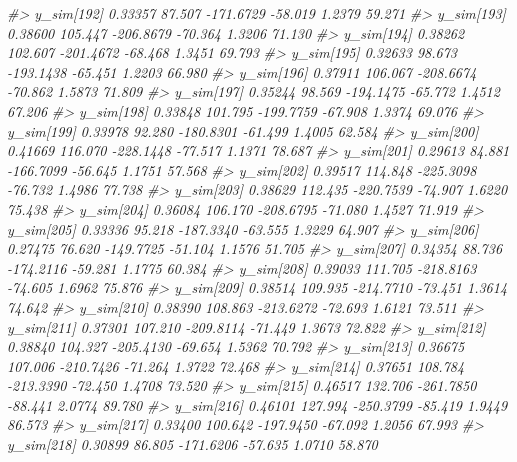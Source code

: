 \documentclass[
  10pt,
  italian,
  a4paper,
  extrafontsizes,onecolumn,openright
  ]{memoir}
\newenvironment{Shaded}{\begin{snugshade}}{\end{snugshade}}
\newcommand{\CommentTok}[1]{\textcolor[rgb]{0.56,0.35,0.01}{\textit{#1}}}
\begin{document}
\begin{Shaded}
\begin{Highlighting}[]
\CommentTok{\#\textgreater{}   y\_sim[192]  0.33357  87.507 {-}171.6729 {-}58.019  1.2379 59.271}
\CommentTok{\#\textgreater{}   y\_sim[193]  0.38600 105.447 {-}206.8679 {-}70.364  1.3206 71.130}
\CommentTok{\#\textgreater{}   y\_sim[194]  0.38262 102.607 {-}201.4672 {-}68.468  1.3451 69.793}
\CommentTok{\#\textgreater{}   y\_sim[195]  0.32633  98.673 {-}193.1438 {-}65.451  1.2203 66.980}
\CommentTok{\#\textgreater{}   y\_sim[196]  0.37911 106.067 {-}208.6674 {-}70.862  1.5873 71.809}
\CommentTok{\#\textgreater{}   y\_sim[197]  0.35244  98.569 {-}194.1475 {-}65.772  1.4512 67.206}
\CommentTok{\#\textgreater{}   y\_sim[198]  0.33848 101.795 {-}199.7759 {-}67.908  1.3374 69.076}
\CommentTok{\#\textgreater{}   y\_sim[199]  0.33978  92.280 {-}180.8301 {-}61.499  1.4005 62.584}
\CommentTok{\#\textgreater{}   y\_sim[200]  0.41669 116.070 {-}228.1448 {-}77.517  1.1371 78.687}
\CommentTok{\#\textgreater{}   y\_sim[201]  0.29613  84.881 {-}166.7099 {-}56.645  1.1751 57.568}
\CommentTok{\#\textgreater{}   y\_sim[202]  0.39517 114.848 {-}225.3098 {-}76.732  1.4986 77.738}
\CommentTok{\#\textgreater{}   y\_sim[203]  0.38629 112.435 {-}220.7539 {-}74.907  1.6220 75.438}
\CommentTok{\#\textgreater{}   y\_sim[204]  0.36084 106.170 {-}208.6795 {-}71.080  1.4527 71.919}
\CommentTok{\#\textgreater{}   y\_sim[205]  0.33336  95.218 {-}187.3340 {-}63.555  1.3229 64.907}
\CommentTok{\#\textgreater{}   y\_sim[206]  0.27475  76.620 {-}149.7725 {-}51.104  1.1576 51.705}
\CommentTok{\#\textgreater{}   y\_sim[207]  0.34354  88.736 {-}174.2116 {-}59.281  1.1775 60.384}
\CommentTok{\#\textgreater{}   y\_sim[208]  0.39033 111.705 {-}218.8163 {-}74.605  1.6962 75.876}
\CommentTok{\#\textgreater{}   y\_sim[209]  0.38514 109.935 {-}214.7710 {-}73.451  1.3614 74.642}
\CommentTok{\#\textgreater{}   y\_sim[210]  0.38390 108.863 {-}213.6272 {-}72.693  1.6121 73.511}
\CommentTok{\#\textgreater{}   y\_sim[211]  0.37301 107.210 {-}209.8114 {-}71.449  1.3673 72.822}
\CommentTok{\#\textgreater{}   y\_sim[212]  0.38840 104.327 {-}205.4130 {-}69.654  1.5362 70.792}
\CommentTok{\#\textgreater{}   y\_sim[213]  0.36675 107.006 {-}210.7426 {-}71.264  1.3722 72.468}
\CommentTok{\#\textgreater{}   y\_sim[214]  0.37651 108.784 {-}213.3390 {-}72.450  1.4708 73.520}
\CommentTok{\#\textgreater{}   y\_sim[215]  0.46517 132.706 {-}261.7850 {-}88.441  2.0774 89.780}
\CommentTok{\#\textgreater{}   y\_sim[216]  0.46101 127.994 {-}250.3799 {-}85.419  1.9449 86.573}
\CommentTok{\#\textgreater{}   y\_sim[217]  0.33400 100.642 {-}197.9450 {-}67.092  1.2056 67.993}
\CommentTok{\#\textgreater{}   y\_sim[218]  0.30899  86.805 {-}171.6206 {-}57.635  1.0710 58.870}

\end{Highlighting}
\end{Shaded}
\end{document}
